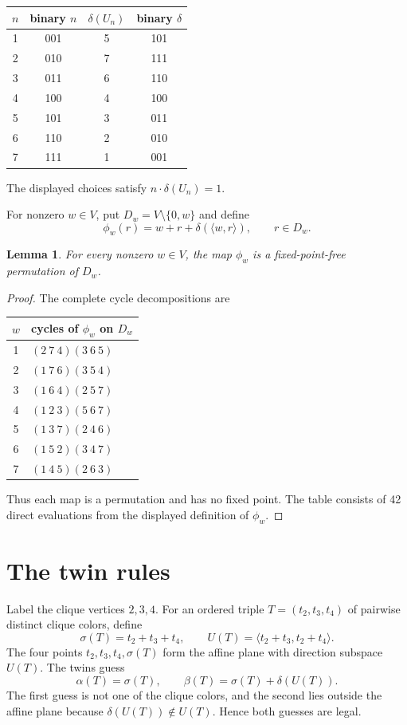 \documentclass[11pt]{article}
\newtheorem{lemma}{Lemma}
\begin{document}
\begin{center}
\begin{tabular}{c@{\qquad}c|c@{\qquad}c}
\toprule
$n$ & binary $n$ & $\delta(U_n)$ & binary $\delta$\\
\midrule
1 & 001 & 5 & 101\\
2 & 010 & 7 & 111\\
3 & 011 & 6 & 110\\
4 & 100 & 4 & 100\\
5 & 101 & 3 & 011\\
6 & 110 & 2 & 010\\
7 & 111 & 1 & 001\\
\bottomrule
\end{tabular}
\end{center}
The displayed choices satisfy $n\cdot\delta(U_n)=1$.

For nonzero $w\in V$, put $D_w=V\setminus\{0,w\}$ and define
\[
  \phi_w(r)=w+r+\delta(\langle w,r\rangle),\qquad r\in D_w.
\]

\begin{lemma}\label{lem:phi}
For every nonzero $w\in V$, the map $\phi_w$ is a fixed-point-free
permutation of $D_w$.
\end{lemma}

\begin{proof}
The complete cycle decompositions are
\begin{center}
\begin{tabular}{c|l}
\toprule
$w$ & cycles of $\phi_w$ on $D_w$\\
\midrule
1 & $(2\ 7\ 4)(3\ 6\ 5)$\\
2 & $(1\ 7\ 6)(3\ 5\ 4)$\\
3 & $(1\ 6\ 4)(2\ 5\ 7)$\\
4 & $(1\ 2\ 3)(5\ 6\ 7)$\\
5 & $(1\ 3\ 7)(2\ 4\ 6)$\\
6 & $(1\ 5\ 2)(3\ 4\ 7)$\\
7 & $(1\ 4\ 5)(2\ 6\ 3)$\\
\bottomrule
\end{tabular}
\end{center}
Thus each map is a permutation and has no fixed point. The table consists of
42 direct evaluations from the displayed definition of $\phi_w$.
\end{proof}

\section{The twin rules}
Label the clique vertices $2,3,4$. For an ordered triple
$T=(t_2,t_3,t_4)$ of pairwise distinct clique colors, define
\[
  \sigma(T)=t_2+t_3+t_4,
  \qquad
  U(T)=\langle t_2+t_3,t_2+t_4\rangle.
\]
The four points $t_2,t_3,t_4,\sigma(T)$ form the affine plane with direction
subspace $U(T)$. The twins guess
\[
  \alpha(T)=\sigma(T),
  \qquad
  \beta(T)=\sigma(T)+\delta(U(T)).
\]
The first guess is not one of the clique colors, and the second lies outside
the affine plane because $\delta(U(T))\notin U(T)$. Hence both guesses are
legal.
\end{document}
